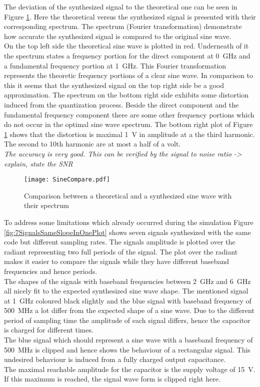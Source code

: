 The deviation of the synthesized signal to the theoretical one can be seen in Figure \ref{fig:SineCompare}.
Here the theoretical versus the synthesized signal is presented with their corresponding spectrum.
The spectrum (Fourier transformation) demonstrate how accurate the synthesized signal is compared to the original sine wave.\\
On the top left side the theoretical sine wave is plotted in red. Underneath of it the spectrum states a frequency portion for the direct component at \SI{0} {\GHz} and a fundamental frequency portion at \SI{1}{\GHz}.
This Fourier transformation represents the theoretic frequency portions of a clear sine wave. 
In comparison to this it seems that the synthesized signal on the top right side be a good approximation.
The spectrum on the bottom right side exhibits some distortion induced from the quantization process. 
Beside the direct component and the fundamental frequency component there are some other frequency portions which do not occur in the optimal sine wave spectrum.
The bottom right plot of Figure \ref{fig:SineCompare} shows that the distortion is maximal \SI{1}{\volt} in amplitude at a the third harmonic. The second to 10th harmonic are at most a half of a volt.\\
\textit{The accuracy is very good. This can be verified by the signal to noise ratio -> explain, state the SNR}

\begin{figure}[htb!]
	\centering
  \texttt{[image: SineCompare.pdf]}
	\caption{Comparison between a theoretical and a synthesized sine wave with their spectrum}
	\label{fig:SineCompare}
\end{figure}

To address some limitations which already occurred during the simulation Figure \ref{fig:7SignalsSameSlopeInOnePlot} shows seven signals synthesized with the same code but different sampling rates.
The signals amplitude is plotted over the radiant representing two full periods of the signal.
The plot over the radiant makes it easier to compare the signals while they have different baseband frequencies and hence periods.\\
The shapes of the signals with baseband frequencies between \SI{2}{\GHz} and \SI{6}{\GHz} all nicely fit to the expected synthesized sine wave shape. 
The mentioned signal at \SI{1}{\GHz} coloured black slightly and the blue signal with baseband frequency of \SI{500}{\MHz} a lot differ from the expected shape of a sine wave.
Due to the different period of sampling time the amplitude of each signal differs, hence the capacitor is charged for different times.\\
The blue signal which should represent a sine wave with a baseband frequency of \SI{500}{\MHz} is clipped and hence shows the behaviour of a rectangular signal. This undesired behaviour is induced from a fully charged output capacitance. \\
The maximal reachable amplitude for the capacitor is the supply voltage of \SI{15}{\volt}. If this maximum is reached, the signal wave form is clipped right here.


